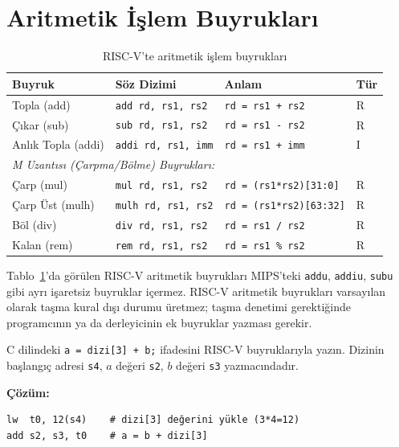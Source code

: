 \section{Aritmetik İşlem Buyrukları}
\label{sec:aritmetik-buyruklar}

\begin{table}[H]
\centering
\caption{RISC-V'te aritmetik işlem buyrukları}
\label{tab:aritmetik-buyruklar}
\small
\begin{tabular}{llll}
\toprule
\textbf{Buyruk} & \textbf{Söz Dizimi} & \textbf{Anlam} & \textbf{Tür} \\
\midrule
Topla (add)         & \texttt{add rd, rs1, rs2}   & \texttt{rd = rs1 + rs2}       & R \\
Çıkar (sub)         & \texttt{sub rd, rs1, rs2}   & \texttt{rd = rs1 - rs2}       & R \\
Anlık Topla (addi)  & \texttt{addi rd, rs1, imm}  & \texttt{rd = rs1 + imm}       & I \\
\midrule
\multicolumn{4}{l}{\textit{M Uzantısı (Çarpma/Bölme) Buyrukları:}} \\
\midrule
Çarp (mul)          & \texttt{mul rd, rs1, rs2}   & \texttt{rd = (rs1*rs2)[31:0]}  & R \\
Çarp Üst (mulh)     & \texttt{mulh rd, rs1, rs2}  & \texttt{rd = (rs1*rs2)[63:32]} & R \\
Böl (div)           & \texttt{div rd, rs1, rs2}   & \texttt{rd = rs1 / rs2}        & R \\
Kalan (rem)         & \texttt{rem rd, rs1, rs2}   & \texttt{rd = rs1 \% rs2}       & R \\
\bottomrule
\end{tabular}
\end{table}

Tablo~\ref{tab:aritmetik-buyruklar}'da görülen RISC-V aritmetik buyrukları MIPS'teki \texttt{addu}, \texttt{addiu}, \texttt{subu} gibi ayrı işaretsiz buyruklar içermez. RISC-V aritmetik buyrukları varsayılan olarak taşma kural dışı durumu üretmez; taşma denetimi gerektiğinde programcının ya da derleyicinin ek buyruklar yazması gerekir.

\begin{ornek}[3.10]
C dilindeki \texttt{a = dizi[3] + b;} ifadesini RISC-V buyruklarıyla yazın. Dizinin başlangıç adresi \texttt{s4}, $a$ değeri \texttt{s2}, $b$ değeri \texttt{s3} yazmacındadır.

\textbf{Çözüm:}
\begin{lstlisting}[style=riscv]
lw  t0, 12(s4)    # dizi[3] değerini yükle (3*4=12)
add s2, s3, t0    # a = b + dizi[3]
\end{lstlisting}
\end{ornek}



